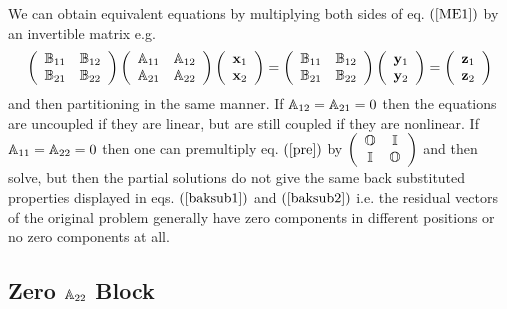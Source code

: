 We can obtain equivalent equations by multiplying both sides of eq. $\left( %
\ref{ME1}\right) $ by an invertible matrix e.g. 
\begin{equation}
\left( 
\begin{array}{cc}
{\Bbb B}_{11} & {\Bbb B}_{12} \\ 
{\Bbb B}_{21} & {\Bbb B}_{22}%
\end{array}%
\right) \left( 
\begin{array}{cc}
{\Bbb A}_{11} & {\Bbb A}_{12} \\ 
{\Bbb A}_{21} & {\Bbb A}_{22}%
\end{array}%
\right) \left( 
\begin{array}{c}
{\bf x}_{1} \\ 
{\bf x}_{2}%
\end{array}%
\right) =\left( 
\begin{array}{cc}
{\Bbb B}_{11} & {\Bbb B}_{12} \\ 
{\Bbb B}_{21} & {\Bbb B}_{22}%
\end{array}%
\right) \left( 
\begin{array}{c}
{\bf y}_{1} \\ 
{\bf y}_{2}%
\end{array}%
\right) =\left( 
\begin{array}{c}
{\bf z}_{1} \\ 
{\bf z}_{2}%
\end{array}%
\right)  \label{pre}
\end{equation}%
and then partitioning in the same manner. If ${\Bbb A}_{12}={\Bbb A}_{21}=0$
then the equations are uncoupled if they are linear, but are still coupled
if they are nonlinear. If ${\Bbb A}_{11}={\Bbb A}_{22}=0$ then one can
premultiply eq. $\left( \ref{pre}\right) $ by $\left( 
\begin{array}{cc}
{\Bbb O} & {\Bbb I} \\ 
{\Bbb I} & {\Bbb O}%
\end{array}%
\right) $ and then solve, but then the partial solutions do not give the
same back substituted properties displayed in eqs. $\left( \ref{baksub1}%
\right) $ and $\left( \ref{baksub2}\right) $ i.e. the residual vectors of
the original problem generally have zero components in different positions
or no zero components at all.

\subsection{Zero ${\Bbb A}_{22}$ Block}

